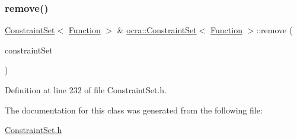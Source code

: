 \subsubsection{\texorpdfstring{remove()}{remove()}\hspace{0.1cm}{\footnotesize\ttfamily [2/2]}}
{\footnotesize\ttfamily \hyperlink{classocra_1_1ConstraintSet}{Constraint\+Set}$<$ \hyperlink{classocra_1_1Function}{Function} $>$ \& \hyperlink{classocra_1_1ConstraintSet}{ocra\+::\+Constraint\+Set}$<$ \hyperlink{classocra_1_1Function}{Function} $>$\+::remove (\begin{DoxyParamCaption}\item[{\hyperlink{classocra_1_1ConstraintSet}{Constraint\+Set}$<$ \hyperlink{classocra_1_1Function}{Function} $>$ \&}]{constraint\+Set }\end{DoxyParamCaption})\hspace{0.3cm}{\ttfamily [inline]}}



Definition at line 232 of file Constraint\+Set.\+h.



The documentation for this class was generated from the following file\+:\begin{DoxyCompactItemize}
\item 
\hyperlink{ConstraintSet_8h}{Constraint\+Set.\+h}\end{DoxyCompactItemize}
